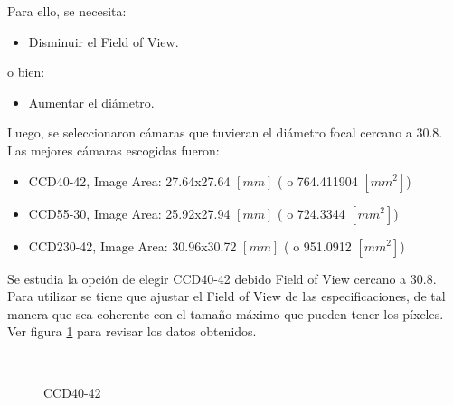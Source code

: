 \documentclass[a4paper,10pt]{article}
\begin{document}
Para ello, se necesita:
\begin{itemize}
\item Disminuir el Field of View.
\end{itemize}
o bien:
\begin{itemize}
\item Aumentar el diámetro.
\end{itemize}

Luego, se seleccionaron cámaras que tuvieran el diámetro focal cercano a 30.8.
Las mejores cámaras escogidas fueron:
\begin{itemize}
\item CCD40-42,  Image Area: 27.64x27.64 $[mm]$ ( o 764.411904 $[mm^2]$)
\item CCD55-30,  Image Area: 25.92x27.94 $[mm]$ ( o 724.3344   $[mm^2]$)
\item CCD230-42, Image Area: 30.96x30.72 $[mm]$ ( o 951.0912   $[mm^2]$)
\end{itemize}
Se estudia la opción de elegir CCD40-42 debido Field of View cercano a 30.8.
Para utilizar se tiene que ajustar el Field of View de las especificaciones, de
tal manera que sea coherente con el tamaño máximo que pueden tener los píxeles.
Ver figura \ref{fig:ccd40p2} para revisar los datos obtenidos.
\begin{figure}[ht!]
  \centering
  ~ 
  ~ 
  \caption{CCD40-42}
  \label{fig:ccd40p2}
\end{figure}
\end{document}

